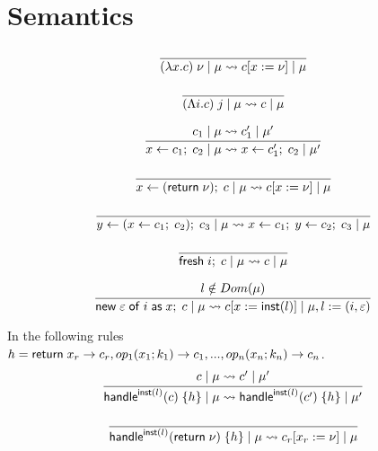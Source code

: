 \newpage
\section{Semantics}

\[\frac{
	\begin{array}{l}
	\end{array}
}{
	(\lambda x . c) \; \nu \; | \; \mu \rightsquigarrow c[x := \nu] \; | \; \mu
}\]

\[\frac{
	\begin{array}{l}
	\end{array}
}{
	(\Lambda i . c) \; j \; | \; \mu \rightsquigarrow c \; | \; \mu
}\]

\[\frac{
	\begin{array}{l}
	c_1 \; | \; \mu \rightsquigarrow c_1' \; | \; \mu'
	\end{array}
}{
	x \leftarrow c_1 ;\; c_2 \; | \; \mu \rightsquigarrow x \leftarrow c_1' ;\; c_2 \; | \; \mu'
}\]

\[\frac{
	\begin{array}{l}
	\end{array}
}{
	x \leftarrow (\mathsf{return} \; \nu) ;\; c \; | \; \mu \rightsquigarrow c[x := \nu] \; | \; \mu
}\]

\[\frac{
	\begin{array}{l}
	\end{array}
}{
	y \leftarrow (x \leftarrow c_1 ;\; c_2) ;\; c_3 \; | \; \mu \rightsquigarrow x \leftarrow c_1 ;\; y \leftarrow c_2 ;\; c_3 \; | \; \mu
}\]

\[\frac{
	\begin{array}{l}
	\end{array}
}{
	\mathsf{fresh} \; i ;\; c \; | \; \mu \rightsquigarrow c \; | \; \mu
}\]

\[\frac{
	\begin{array}{l}
	l \notin Dom(\mu)
	\end{array}
}{
	\mathsf{new} \; \varepsilon \; \mathsf{of} \; i \; \mathsf{as} \; x ;\; c \; | \; \mu \rightsquigarrow c[x := \mathsf{inst}(l)] \; | \; \mu,l := (i, \varepsilon)
}\]

In the following rules \\$h = {
		\mathsf{return} \; x_r \rightarrow c_r,
		op_1(x_1 ; k_1) \rightarrow c_1,
		...,
		op_n(x_n ; k_n) \rightarrow c_n
}$.\\

\[\frac{
	\begin{array}{l}
	c \; | \; \mu \rightsquigarrow c' \; | \; \mu'
	\end{array}
}{
	\mathsf{handle}^{\mathsf{inst}(l)} ( c ) \; \{h\} \; | \; \mu \rightsquigarrow \mathsf{handle}^{\mathsf{inst}(l)} ( c' ) \; \{h\} \; | \; \mu'
}\]

\[\frac{
	\begin{array}{l}
	\end{array}
}{
	\mathsf{handle}^{\mathsf{inst}(l)} ( \mathsf{return} \; \nu ) \; \{h\} \; | \; \mu \rightsquigarrow c_r[x_r := \nu] \; | \; \mu
}\]

